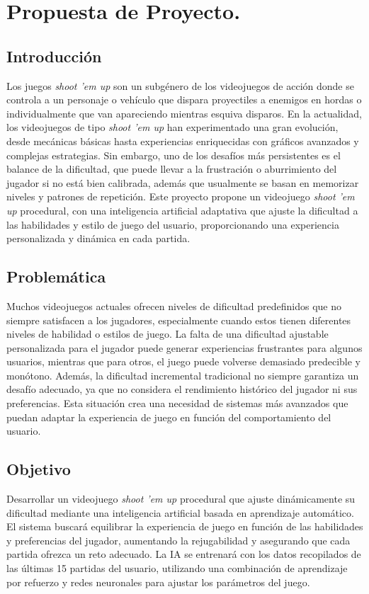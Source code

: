 \section{Propuesta de Proyecto.}
    \subsection{Introducción}
    Los juegos \textit{shoot 'em up} son un subgénero de los videojuegos de acción donde se controla a un personaje o vehículo que dispara proyectiles a enemigos en hordas o individualmente que van apareciendo mientras esquiva disparos.
    En la actualidad, los videojuegos de tipo \textit{shoot 'em up} han experimentado una gran evolución, desde mecánicas básicas hasta experiencias enriquecidas con gráficos avanzados y complejas estrategias. Sin embargo, uno de los desafíos más persistentes es el balance de la dificultad, que puede llevar a la frustración o aburrimiento del jugador si no está bien calibrada, además que usualmente se basan en memorizar niveles y patrones de repetición. Este proyecto propone un videojuego \textit{shoot 'em up} procedural, con una inteligencia artificial adaptativa que ajuste la dificultad a las habilidades y estilo de juego del usuario, proporcionando una experiencia personalizada y dinámica en cada partida.

    \subsection{Problemática}
    Muchos videojuegos actuales ofrecen niveles de dificultad predefinidos que no siempre satisfacen a los jugadores, especialmente cuando estos tienen diferentes niveles de habilidad o estilos de juego. La falta de una dificultad ajustable personalizada para el jugador puede generar experiencias frustrantes para algunos usuarios, mientras que para otros, el juego puede volverse demasiado predecible y monótono. Además, la dificultad incremental tradicional no siempre garantiza un desafío adecuado, ya que no considera el rendimiento histórico del jugador ni sus preferencias. Esta situación crea una necesidad de sistemas más avanzados que puedan adaptar la experiencia de juego en función del comportamiento del usuario.
    
    \subsection{Objetivo}
    
    Desarrollar un videojuego \textit{shoot 'em up} procedural que ajuste dinámicamente su dificultad mediante una inteligencia artificial basada en aprendizaje automático. El sistema buscará equilibrar la experiencia de juego en función de las habilidades y preferencias del jugador, aumentando la rejugabilidad y asegurando que cada partida ofrezca un reto adecuado. La IA se entrenará con los datos recopilados de las últimas 15 partidas del usuario, utilizando una combinación de aprendizaje por refuerzo y redes neuronales para ajustar los parámetros del juego.
    

